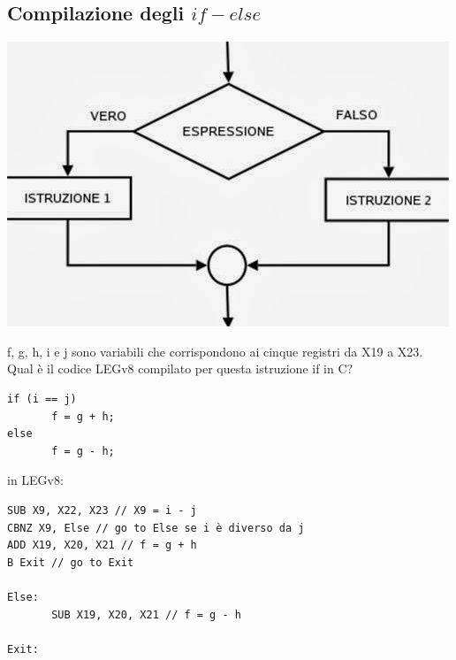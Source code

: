 \documentclass[12pt,a4paper]{article}
\begin{document}
\subsection{Compilazione degli $if-else$}
\begin{center}
\includegraphics[width=0.7\columnwidth]{img/if.jpg}
\end{center}
f, g, h, i e j sono variabili che corrispondono ai cinque registri da X19 a X23.\\
Qual è il codice LEGv8 compilato per questa istruzione if in C?
\begin{center}
\begin{minipage}{.4\linewidth}
\begin{verbatim}
if (i == j)
       f = g + h;
else
       f = g - h;
\end{verbatim}
\end{minipage}
\end{center}
in LEGv8:
\begin{verbatim}
SUB X9, X22, X23 // X9 = i - j
CBNZ X9, Else // go to Else se i è diverso da j
ADD X19, X20, X21 // f = g + h
B Exit // go to Exit

Else: 
       SUB X19, X20, X21 // f = g - h

Exit:
\end{verbatim}
\end{document}
